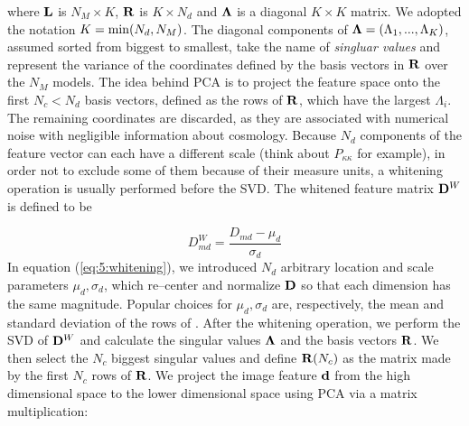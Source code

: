 %
where $\mathbf{L}$ is $N_M\times K$, $\mathbf{R}$ is $K\times N_d$ and $\mathbf{\Lambda}$ is a diagonal $K\times K$ matrix. We adopted the notation $K={\rm min}(N_d,N_M)$. The diagonal components of $\mathbf{\Lambda}=(\Lambda_1,...,\Lambda_K)$, assumed sorted from biggest to smallest, take the name of \textit{singluar values} and represent the variance of the coordinates defined by the basis vectors in $\mathbf{R}$ over the $N_M$ models. The idea behind PCA is to project the feature space onto the first $N_c<N_d$ basis vectors, defined as the rows of $\mathbf{R}$, which have the largest $\Lambda_i$. The remaining coordinates are discarded, as they are associated with numerical noise with negligible information about cosmology. Because $N_d$ components of the feature vector can each have a different scale (think about $P_{\kappa\kappa}$ for example), in order not to exclude some of them because of their measure units, a whitening operation is usually performed before the SVD. The whitened feature matrix $\mathbf{D}^W$ is defined to be

\begin{equation}
\label{eq:5:whitening}
D^W_{md} = \frac{D_{md}-\mu_d}{\sigma_d}
\end{equation}
%
In equation (\ref{eq:5:whitening}), we introduced $N_d$ arbitrary location and scale parameters $\mu_d,\sigma_d$, which re--center and normalize $\mathbf{D}$ so that each dimension has the same magnitude. Popular choices for $\mu_d,\sigma_d$ are, respectively, the mean and standard deviation of the rows of \citep{astroMLText}. After the whitening operation, we perform the SVD of $\mathbf{D}^W$ and calculate the singular values $\mathbf{\Lambda}$ and the basis vectors $\mathbf{R}$. We then select the $N_c$ biggest singular values and define $\mathbf{R}(N_c)$ as the matrix made by the first $N_c$ rows of $\mathbf{R}$. We project the image feature $\mathbf{d}$ from the high dimensional space to the lower dimensional space using PCA via a matrix multiplication: 

